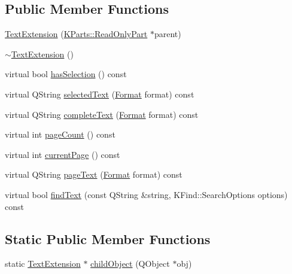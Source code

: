 \subsection*{Public Member Functions}
\begin{DoxyCompactItemize}
\item 
\hyperlink{classKParts_1_1TextExtension_a1c7077a3114c42f4b6cf78d4254fe5d0}{Text\+Extension} (\hyperlink{classKParts_1_1ReadOnlyPart}{K\+Parts\+::\+Read\+Only\+Part} $\ast$parent)
\item 
\hyperlink{classKParts_1_1TextExtension_a6d4e46c6cc819826182c3fc522a36b71}{$\sim$\+Text\+Extension} ()
\item 
virtual bool \hyperlink{classKParts_1_1TextExtension_a68623c6e7e7f57967c382550ccb3c00e}{has\+Selection} () const 
\item 
virtual Q\+String \hyperlink{classKParts_1_1TextExtension_a5ea4fb6f2237489affcde7c03e531574}{selected\+Text} (\hyperlink{classKParts_1_1TextExtension_a65ad08598c74eae19f0c7772a251685d}{Format} format) const 
\item 
virtual Q\+String \hyperlink{classKParts_1_1TextExtension_a42209cf90f31da5a3b01087518ad8625}{complete\+Text} (\hyperlink{classKParts_1_1TextExtension_a65ad08598c74eae19f0c7772a251685d}{Format} format) const 
\item 
virtual int \hyperlink{classKParts_1_1TextExtension_a62e0cd5df36c13591ed526bf58487d96}{page\+Count} () const 
\item 
virtual int \hyperlink{classKParts_1_1TextExtension_a3351795dd9a2257127ce978aaff68448}{current\+Page} () const 
\item 
virtual Q\+String \hyperlink{classKParts_1_1TextExtension_ab0a417697ec8edb599ba35f38bf90261}{page\+Text} (\hyperlink{classKParts_1_1TextExtension_a65ad08598c74eae19f0c7772a251685d}{Format} format) const 
\item 
virtual bool \hyperlink{classKParts_1_1TextExtension_aaaf29f56cbe212b3eea11d3811bfd270}{find\+Text} (const Q\+String \&string, K\+Find\+::\+Search\+Options options) const 
\end{DoxyCompactItemize}
\subsection*{Static Public Member Functions}
\begin{DoxyCompactItemize}
\item 
static \hyperlink{classKParts_1_1TextExtension}{Text\+Extension} $\ast$ \hyperlink{classKParts_1_1TextExtension_ae6a6df769ff322ad46396e83f26e8dec}{child\+Object} (Q\+Object $\ast$obj)
\end{DoxyCompactItemize}


